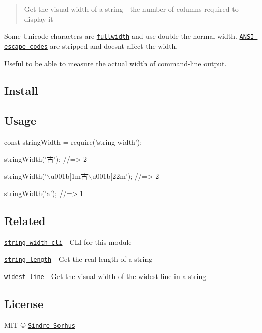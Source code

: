 \begin{quote}
Get the visual width of a string -\/ the number of columns required to display it \end{quote}


Some Unicode characters are \href{https://en.wikipedia.org/wiki/Halfwidth_and_fullwidth_forms}{\tt fullwidth} and use double the normal width. \href{https://en.wikipedia.org/wiki/ANSI_escape_code}{\tt A\+N\+SI escape codes} are stripped and doesn\textquotesingle{}t affect the width.

Useful to be able to measure the actual width of command-\/line output.

\subsection*{Install}




\subsection*{Usage}


\begin{DoxyCode}
const stringWidth = require('string-width');

stringWidth('古');
//=> 2

stringWidth('\(\backslash\)u001b[1m古\(\backslash\)u001b[22m');
//=> 2

stringWidth('a');
//=> 1
\end{DoxyCode}


\subsection*{Related}


\begin{DoxyItemize}
\item \href{https://github.com/sindresorhus/string-width-cli}{\tt string-\/width-\/cli} -\/ C\+LI for this module
\item \href{https://github.com/sindresorhus/string-length}{\tt string-\/length} -\/ Get the real length of a string
\item \href{https://github.com/sindresorhus/widest-line}{\tt widest-\/line} -\/ Get the visual width of the widest line in a string
\end{DoxyItemize}

\subsection*{License}

M\+IT © \href{https://sindresorhus.com}{\tt Sindre Sorhus} 